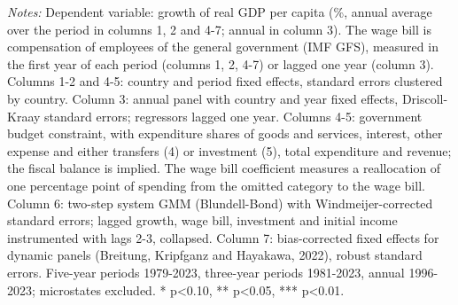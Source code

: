 \begin{table}[htbp]
\begin{minipage}{0.95\linewidth}\vspace{4pt}\scriptsize \textit{Notes:} Dependent variable: growth of real GDP per capita (\%, annual average over the period in columns 1, 2 and 4-7; annual in column 3). The wage bill is compensation of employees of the general government (IMF GFS), measured in the first year of each period (columns 1, 2, 4-7) or lagged one year (column 3). Columns 1-2 and 4-5: country and period fixed effects, standard errors clustered by country. Column 3: annual panel with country and year fixed effects, Driscoll-Kraay standard errors; regressors lagged one year. Columns 4-5: government budget constraint, with expenditure shares of goods and services, interest, other expense and either transfers (4) or investment (5), total expenditure and revenue; the fiscal balance is implied. The wage bill coefficient measures a reallocation of one percentage point of spending from the omitted category to the wage bill. Column 6: two-step system GMM (Blundell-Bond) with Windmeijer-corrected standard errors; lagged growth, wage bill, investment and initial income instrumented with lags 2-3, collapsed. Column 7: bias-corrected fixed effects for dynamic panels (Breitung, Kripfganz and Hayakawa, 2022), robust standard errors. Five-year periods 1979-2023, three-year periods 1981-2023, annual 1996-2023; microstates excluded. * p<0.10, ** p<0.05, *** p<0.01.\end{minipage}
\end{table}
